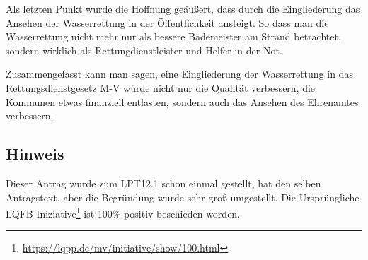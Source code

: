 Als letzten Punkt wurde die Hoffnung geäußert, dass durch die Eingliederung das Ansehen der Wasserrettung in der Öffentlichkeit ansteigt. So dass man die Wasserrettung nicht mehr nur als bessere Bademeister am Strand betrachtet, sondern wirklich als Rettungdienstleister und Helfer in der Not.

Zusammengefasst kann man sagen, eine Eingliederung der Wasserrettung in das Rettungsdienstgesetz M-V würde nicht nur die Qualität verbessern, die Kommunen etwas finanziell entlasten, sondern auch das Ansehen des Ehrenamtes verbessern.

\subsection{Hinweis}

Dieser Antrag wurde zum LPT12.1 schon einmal gestellt, hat den selben Antragstext, aber die Begründung wurde sehr groß umgestellt. Die Ursprüngliche LQFB-Iniziative\footnote{\url{https://lqpp.de/mv/initiative/show/100.html}} ist 100\% positiv beschieden worden.
